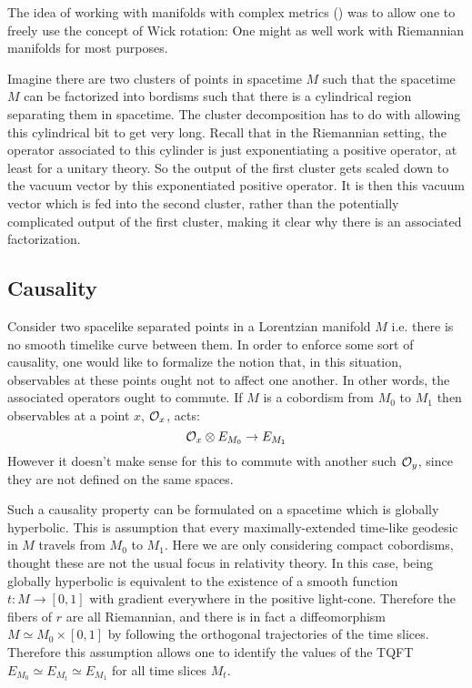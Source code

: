 The idea of working with manifolds with complex metrics () 
was to allow one to freely use the concept of Wick rotation: One might as well work with
Riemannian manifolds for most purposes. 

Imagine there are two clusters of points in spacetime $M$ such that the spacetime $M$ can
be factorized into bordisms such that there is a cylindrical region separating them in
spacetime.
The cluster decomposition has to do with allowing this cylindrical bit to get very long. 
Recall that in the Riemannian setting, the operator associated to this cylinder is just
exponentiating a positive operator, at least for a unitary theory. 
So the output of the first cluster gets scaled down to the vacuum vector by this
exponentiated positive operator.
It is then this vacuum vector which is fed into the  second cluster, rather than the
potentially complicated output of the first cluster, making it clear why there is an
associated factorization. 

\subsection{Causality}
\label{sec:causality}

Consider two spacelike separated points in a 
Lorentzian manifold $M$ i.e. there is no smooth timelike curve between them. 
In order to enforce some sort of causality, one would like to formalize the notion that,
in this situation, observables at these points ought not to affect one another. In other
words, the associated operators ought to commute.
If $M$ is a cobordism from $M_0$ to $M_1$ then observables at a point $x$,
$\mathcal{O}_x$, acts:
\begin{equation*}
\mathcal{O}_x \otimes E_{M_0} \to E_{M_1} 
\end{equation*}
However it doesn't make sense for this to commute with another such $\mathcal{O}_y$, since they
are not defined on the same spaces. 

Such a causality property can be formulated on a spacetime which is globally hyperbolic.
This is assumption that every maximally-extended time-like geodesic in $M$ travels from
$M_0$ to $M_1$.
Here we are only considering compact cobordisms, thought these are not the usual focus in
relativity theory.
In this case, being globally hyperbolic is equivalent to the existence of a smooth 
function $t \colon M \to \left[0,1\right]$ with gradient everywhere in the positive
light-cone. Therefore the fibers of $r$ are all Riemannian, and there is in fact a
diffeomorphism $M\simeq M_0 \times \left[0,1\right]$ by following the orthogonal
trajectories of the time slices.
Therefore this assumption allows one to identify the values of the TQFT $E_{M_0} \simeq
E_{M_t}\simeq E_{M_1}$ for all time slices $M_t$. 

